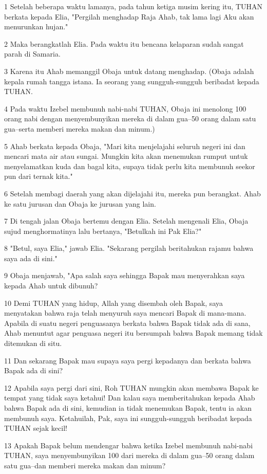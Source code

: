 \par 1 Setelah beberapa waktu lamanya, pada tahun ketiga musim kering itu, TUHAN berkata kepada Elia, "Pergilah menghadap Raja Ahab, tak lama lagi Aku akan menurunkan hujan."
\par 2 Maka berangkatlah Elia. Pada waktu itu bencana kelaparan sudah sangat parah di Samaria.
\par 3 Karena itu Ahab memanggil Obaja untuk datang menghadap. (Obaja adalah kepala rumah tangga istana. Ia seorang yang sungguh-sungguh beribadat kepada TUHAN.
\par 4 Pada waktu Izebel membunuh nabi-nabi TUHAN, Obaja ini menolong 100 orang nabi dengan menyembunyikan mereka di dalam gua--50 orang dalam satu gua--serta memberi mereka makan dan minum.)
\par 5 Ahab berkata kepada Obaja, "Mari kita menjelajahi seluruh negeri ini dan mencari mata air atau sungai. Mungkin kita akan menemukan rumput untuk menyelamatkan kuda dan bagal kita, supaya tidak perlu kita membunuh seekor pun dari ternak kita."
\par 6 Setelah membagi daerah yang akan dijelajahi itu, mereka pun berangkat. Ahab ke satu jurusan dan Obaja ke jurusan yang lain.
\par 7 Di tengah jalan Obaja bertemu dengan Elia. Setelah mengenali Elia, Obaja sujud menghormatinya lalu bertanya, "Betulkah ini Pak Elia?"
\par 8 "Betul, saya Elia," jawab Elia. "Sekarang pergilah beritahukan rajamu bahwa saya ada di sini."
\par 9 Obaja menjawab, "Apa salah saya sehingga Bapak mau menyerahkan saya kepada Ahab untuk dibunuh?
\par 10 Demi TUHAN yang hidup, Allah yang disembah oleh Bapak, saya menyatakan bahwa raja telah menyuruh saya mencari Bapak di mana-mana. Apabila di suatu negeri penguasanya berkata bahwa Bapak tidak ada di sana, Ahab menuntut agar penguasa negeri itu bersumpah bahwa Bapak memang tidak ditemukan di situ.
\par 11 Dan sekarang Bapak mau supaya saya pergi kepadanya dan berkata bahwa Bapak ada di sini?
\par 12 Apabila saya pergi dari sini, Roh TUHAN mungkin akan membawa Bapak ke tempat yang tidak saya ketahui! Dan kalau saya memberitahukan kepada Ahab bahwa Bapak ada di sini, kemudian ia tidak menemukan Bapak, tentu ia akan membunuh saya. Ketahuilah, Pak, saya ini sungguh-sungguh beribadat kepada TUHAN sejak kecil!
\par 13 Apakah Bapak belum mendengar bahwa ketika Izebel membunuh nabi-nabi TUHAN, saya menyembunyikan 100 dari mereka di dalam gua--50 orang dalam satu gua--dan memberi mereka makan dan minum?
